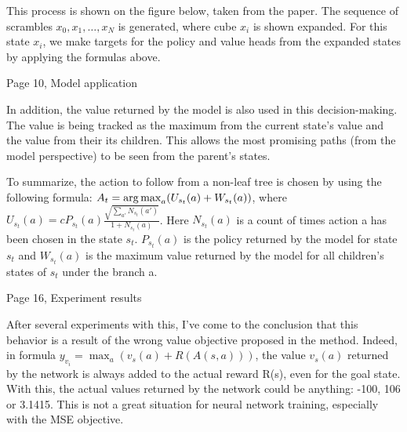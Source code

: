 This process is shown on the figure below, taken from the paper. The sequence of scrambles \begin{math}x_0,x_1,\ldots,x_N\end{math} is generated, where cube \begin{math}x_i\end{math} is shown expanded. For this state \begin{math}x_i\end{math}, we make targets for the policy and value heads from the expanded states by applying the formulas above.

Page 10, Model application

In addition, the value returned by the model is also used in this decision-making. The value is being tracked as the maximum from the current state's value and the value from their its children. This allows the most promising paths (from the model perspective) to be seen from the parent's states.

To summarize, the action to follow from a non-leaf tree is chosen by using the following formula: 
\begin{math}A_t = \operatorname*{arg\,max}_a (U_{s_t}(a) + W_{s_t}(a))\end{math}, where \begin{math}U_{s_t}(a) = c P_{s_t}(a) \frac{\sqrt{\sum_{a'}N_{s_t}(a')}}{1 + N_{s_t}(a)}\end{math}. 
Here \begin{math}N_{s_t}(a)\end{math} is a count of times action a has been chosen in the state \begin{math}s_t\end{math}. \begin{math}P_{s_t}(a)\end{math} is the policy returned by the model for state \begin{math}s_t\end{math} and \begin{math}W_{s_t}(a)\end{math} is the maximum value returned by the model for all children's states of \begin{math}s_t\end{math} under the branch a. 


Page 16, Experiment results

After several experiments with this, I've come to the conclusion that this behavior is a result of the wrong value objective proposed in the method. Indeed, in formula \begin{math}y_{v_i} = \max_a (v_s(a) + R(A(s, a)))\end{math}, the value \begin{math}v_s(a)\end{math} returned by the network is always added to the actual reward R(s), even for the goal state. With this, the actual values returned by the network could be anything: -100, 106 or 3.1415. This is not a great situation for neural network training, especially with the MSE objective. 

